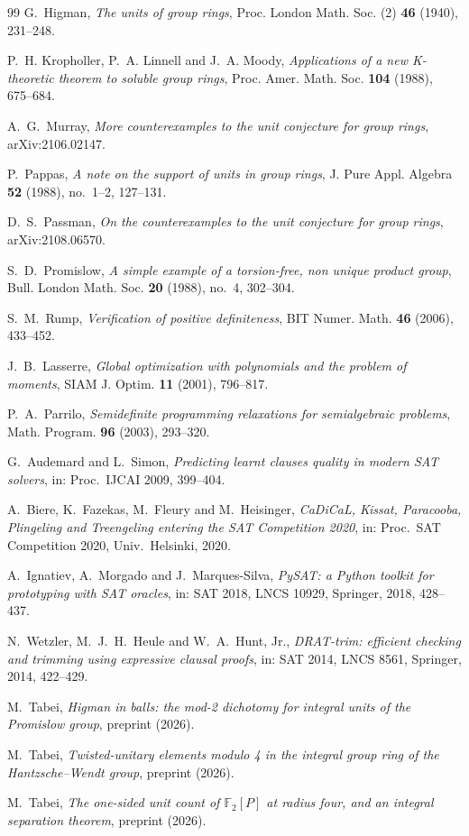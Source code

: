 \documentclass[11pt]{article}
\begin{document}
\begin{thebibliography}{99}
 G.~Higman, \emph{The units of group rings},
Proc. London Math. Soc. (2) \textbf{46} (1940), 231--248.

 P.~H. Kropholler, P.~A. Linnell and J.~A. Moody,
\emph{Applications of a new K-theoretic theorem to soluble group
rings}, Proc. Amer. Math. Soc. \textbf{104} (1988), 675--684.

 A.~G.~Murray, \emph{More counterexamples to the
unit conjecture for group rings}, arXiv:2106.02147.

 P.~Pappas, \emph{A note on the support of units
in group rings}, J. Pure Appl. Algebra \textbf{52} (1988), no.~1--2,
127--131.

 D.~S.~Passman, \emph{On the counterexamples to
the unit conjecture for group rings}, arXiv:2108.06570.

 S.~D.~Promislow, \emph{A simple example of a
torsion-free, non unique product group}, Bull. London Math. Soc.
\textbf{20} (1988), no.~4, 302--304.

 S.~M.~Rump, \emph{Verification of positive
definiteness}, BIT Numer. Math. \textbf{46} (2006), 433--452.

 J.~B.~Lasserre, \emph{Global optimization with
polynomials and the problem of moments}, SIAM J. Optim. \textbf{11}
(2001), 796--817.

 P.~A.~Parrilo, \emph{Semidefinite programming
relaxations for semialgebraic problems}, Math. Program. \textbf{96}
(2003), 293--320.

 G.~Audemard and L.~Simon, \emph{Predicting learnt
clauses quality in modern SAT solvers}, in: Proc.\ IJCAI 2009,
399--404.

 A.~Biere, K.~Fazekas, M.~Fleury and M.~Heisinger,
\emph{CaDiCaL, Kissat, Paracooba, Plingeling and Treengeling entering
the SAT Competition 2020}, in: Proc.\ SAT Competition 2020, Univ.\
Helsinki, 2020.

 A.~Ignatiev, A.~Morgado and J.~Marques-Silva,
\emph{PySAT: a Python toolkit for prototyping with SAT oracles}, in:
SAT 2018, LNCS 10929, Springer, 2018, 428--437.

 N.~Wetzler, M.~J.~H.~Heule and W.~A.~Hunt, Jr.,
\emph{DRAT-trim: efficient checking and trimming using expressive
clausal proofs}, in: SAT 2014, LNCS 8561, Springer, 2014, 422--429.

 M.~Tabei, \emph{Higman in balls: the mod-2 dichotomy
for integral units of the Promislow group}, preprint (2026).

 M.~Tabei, \emph{Twisted-unitary elements modulo 4 in
the integral group ring of the Hantzsche--Wendt group}, preprint
(2026).

 M.~Tabei, \emph{The one-sided unit count of
$\mathbb{F}_2[P]$ at radius four, and an integral separation theorem},
preprint (2026).

\end{thebibliography}
\end{document}
